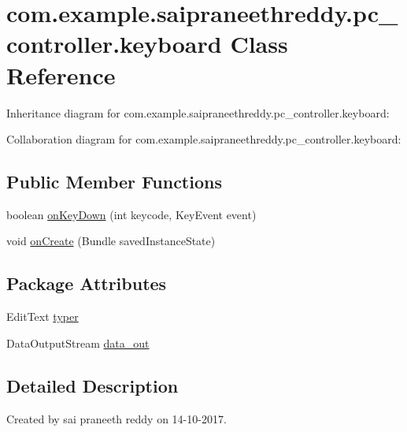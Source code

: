 \hypertarget{classcom_1_1example_1_1saipraneethreddy_1_1pc__controller_1_1keyboard}{}\section{com.\+example.\+saipraneethreddy.\+pc\+\_\+controller.\+keyboard Class Reference}
\label{classcom_1_1example_1_1saipraneethreddy_1_1pc__controller_1_1keyboard}


Inheritance diagram for com.\+example.\+saipraneethreddy.\+pc\+\_\+controller.\+keyboard\+:


Collaboration diagram for com.\+example.\+saipraneethreddy.\+pc\+\_\+controller.\+keyboard\+:
\subsection*{Public Member Functions}
\begin{DoxyCompactItemize}
\item 
boolean \hyperlink{classcom_1_1example_1_1saipraneethreddy_1_1pc__controller_1_1keyboard_a876bdbf4c98cc283174e8bf612dccca9}{on\+Key\+Down} (int keycode, Key\+Event event)
\item 
void \hyperlink{classcom_1_1example_1_1saipraneethreddy_1_1pc__controller_1_1keyboard_a107c6da8e688e5299d95b7b1818165c8}{on\+Create} (Bundle saved\+Instance\+State)
\end{DoxyCompactItemize}
\subsection*{Package Attributes}
\begin{DoxyCompactItemize}
\item 
Edit\+Text \hyperlink{classcom_1_1example_1_1saipraneethreddy_1_1pc__controller_1_1keyboard_a146b9bcadad110666d3ea2913d1305c6}{typer}
\item 
Data\+Output\+Stream \hyperlink{classcom_1_1example_1_1saipraneethreddy_1_1pc__controller_1_1keyboard_a8bc7a8e740b54025313de5b163a03dfc}{data\+\_\+out}
\end{DoxyCompactItemize}


\subsection{Detailed Description}
Created by sai praneeth reddy on 14-\/10-\/2017. 

